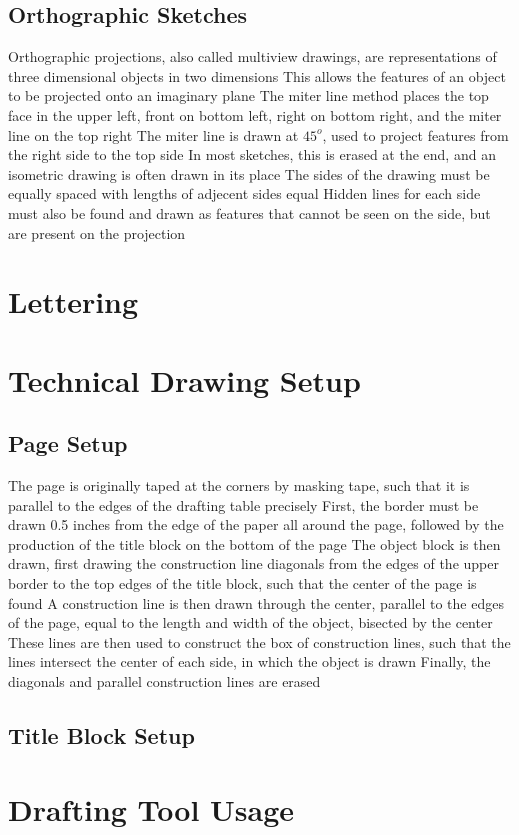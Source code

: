 \documentclass[11 pt, twoside]{article}
\newenvironment{outline*}
{
	\begin{outline}[enumerate]
	}
	{\end{outline}
}
\begin{document}
\subsection{Orthographic Sketches}
\begin{outline*}
\1 Orthographic projections, also called multiview drawings, are representations of three dimensional objects in two dimensions
\2 This allows the features of an object to be projected onto an imaginary plane
\1 The miter line method places the top face in the upper left, front on bottom left, right on bottom right, and the miter line on the top right
\2 The miter line is drawn at $45^o$, used to project features from the right side to the top side
\3 In most sketches, this is erased at the end, and an isometric drawing is often drawn in its place
\2 The sides of the drawing must be equally spaced with lengths of adjecent sides equal
\2 Hidden lines for each side must also be found and drawn as features that cannot be seen on the side, but are present on the projection
\end{outline*}
\section{Lettering}
\begin{outline*}

\end{outline*}

\section{Technical Drawing Setup}
\subsection{Page Setup}
\begin{outline*}
\1 The page is originally taped at the corners by masking tape, such that it is parallel to the edges of the drafting table precisely 
\1 First, the border must be drawn 0.5 inches from the edge of the paper all around the page, followed by the production of the title block on the bottom of the page
\1 The object block is then drawn, first drawing the construction line diagonals from the edges of the upper border to the top edges of the title block, such that the center of the page is found
\2 A construction line is then drawn through the center, parallel to the edges of the page, equal to the length and width of the object, bisected by the center
\2 These lines are then used to construct the box of construction lines, such that the lines intersect the center of each side, in which the object is drawn
\2 Finally, the diagonals and parallel construction lines are erased
\end{outline*}

\subsection{Title Block Setup}
\begin{outline*}

\end{outline*}

\section{Drafting Tool Usage}
\begin{outline*}

\end{outline*}
\end{document}
